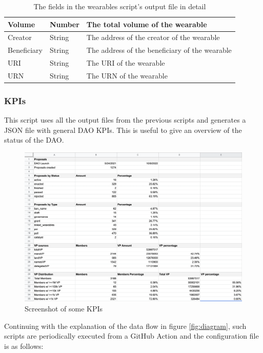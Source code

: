 \documentclass[MSE,Master,english]{twbook}%
\begin{document}
\begin{table}[H]
\begin{tabularx}{\textwidth}{|l|l|X|}
  Volume       & Number  & The total volume of the wearable                 \\ \hline
  Creator      & String  & The address of the creator of the wearable       \\ \hline
  Beneficiary  & String  & The address of the beneficiary of the wearable   \\ \hline
  URI          & String  & The URI of the wearable                          \\ \hline
  URN          & String  & The URN of the wearable                          \\ \hline
  \end{tabularx}
  \caption{The fields in the wearables script's output file in detail}
  \label{table:wearables}
\end{table}

\subsubsection{KPIs}
This script uses all the output files from the previous scripts and generates a JSON file with general DAO KPIs. This is useful to give an overview of the status of the DAO.
\begin{figure}[H]
  \centering
  \includegraphics[width=\textwidth]{kpis.png}
  \caption{Screenshot of some KPIs}
  \label{fig:kpis}
\end{figure}

\pagebreak

Continuing with the explanation of the data flow in figure \ref{fig:diagram}, such scripts are periodically executed from a GitHub Action and the configuration file\cite{configFile} is as follows: \\
\end{document}
